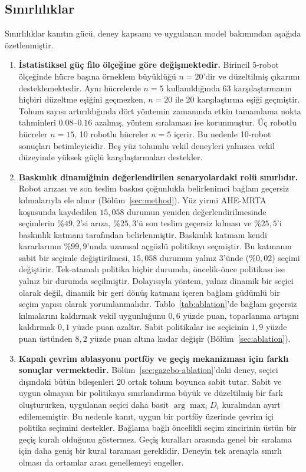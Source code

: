 \documentclass[10pt,letterpaper,onecolumn]{IEEEtran}
\begin{document}
\subsection{Sınırlılıklar}
\label{sec:limitations}

Sınırlılıklar kanıtın gücü, deney kapsamı ve uygulanan model bakımından aşağıda
özetlenmiştir.

\begin{enumerate}
  \item \textbf{İstatistiksel güç filo ölçeğine göre değişmektedir.}
  Birincil 5-robot ölçeğinde hücre başına örneklem büyüklüğü $n{=}20$'dir ve
  düzeltilmiş çıkarımı desteklemektedir. Aynı hücrelerde $n{=}5$ kullanıldığında
  63 karşılaştırmanın hiçbiri düzeltme eşiğini geçmezken, $n{=}20$ ile 20
  karşılaştırma eşiği geçmiştir. Tohum sayısı artırıldığında dört yöntemin
  zamanında etkin tamamlama nokta tahminleri $0.08$--$0.16$ azalmış, yöntem
  sıralaması ise korunmuştur. Üç robotlu hücreler $n{=}15$, 10 robotlu hücreler
  $n{=}5$ içerir. Bu nedenle 10-robot sonuçları betimleyicidir. Beş yüz tohumlu
  vekil deneyleri yalnızca vekil düzeyinde yüksek güçlü karşılaştırmaları
  destekler.

  \item \textbf{Baskınlık dinamiğinin değerlendirilen senaryolardaki rolü
  sınırlıdır.} Robot arızası ve son teslim baskısı çoğunlukla belirlenimci
  bağlam geçersiz kılmalarıyla ele alınır (Bölüm~\ref{sec:method}). Yüz yirmi
  AHE-MRTA koşusunda kaydedilen $15{,}058$ durumun yeniden değerlendirilmesinde
  seçimlerin \%$49{,}2$'si arıza, \%$25{,}3$'ü son teslim geçersiz kılması ve
  \%$25{,}5$'i baskınlık katmanı tarafından belirlenmiştir. Baskınlık katmanı
  kendi kararlarının \%$99{,}9$'unda uzamsal açgözlü politikayı seçmiştir. Bu
  katmanın sabit bir seçimle değiştirilmesi, $15{,}058$ durumun yalnız 3'ünde
  (\%$0{,}02$) seçimi değiştirir. Tek-atamalı politika hiçbir durumda,
  öncelik-önce politikası ise yalnız bir durumda seçilmiştir. Dolayısıyla
  yöntem, yalnız dinamik bir seçici olarak değil, dinamik bir geri dönüş
  katmanı içeren bağlam güdümlü bir seçim yapısı olarak yorumlanmalıdır.
  Tablo~\ref{tab:ablation}'de bağlam geçersiz kılmalarını kaldırmak vekil
  uygunluğunu $0{,}6$ yüzde puan, toparlanma artışını kaldırmak $0{,}1$ yüzde
  puan azaltır. Sabit politikalar ise seçicinin $1{,}9$ yüzde puan üstünden
  $8{,}2$ yüzde puan altına kadar değişir (Bölüm~\ref{sec:ablation}).

  \item \textbf{Kapalı çevrim ablasyonu portföy ve geçiş mekanizması için
  farklı sonuçlar vermektedir.} Bölüm~\ref{sec:gazebo-ablation}'daki deney,
  seçici dışındaki bütün bileşenleri 20 ortak tohum boyunca sabit tutar. Sabit
  ve uygun olmayan bir politikaya sınırlandırma büyük ve düzeltilmiş bir fark
  oluştururken, uygulanan seçici daha basit $\arg\max_i D_i$ kuralından ayırt
  edilememiştir. Bu nedenle kanıt, uygun bir portföy üzerinde çevrim içi politika
  seçimini destekler. Bağlama bağlı öncelikli seçim zincirinin üstün bir geçiş
  kuralı olduğunu
  göstermez. Geçiş kuralları arasında genel bir sıralama için daha geniş bir
  kural taraması gereklidir. Deneyin tek arenayla sınırlı olması da ortamlar
  arası genellemeyi engeller.


\end{enumerate}
\end{document}
